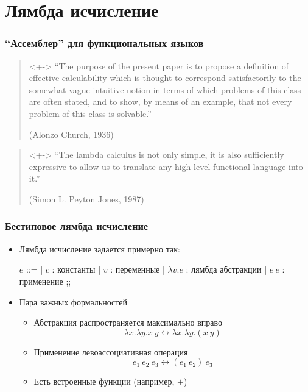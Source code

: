\documentclass[aspectratio=169]{beamer}
\begin{document}
\section{Лямбда исчисление}
\begin{frame}
    \frametitle{\enquote{Ассемблер} для функциональных языков}

    \begin{quotation}<+->
        \enquote{The purpose of the present paper is to propose a definition of effective calculability which is thought to correspond satisfactorily to the somewhat vague intuitive notion in terms of which problems of this class are often stated, and to show, by means of an example, that not every problem of this class is solvable.}

        \raggedleft
        (Alonzo Church, 1936)
    \end{quotation}

    \begin{quotation}<+->
        \enquote{The lambda calculus is not only simple, it is also sufficiently expressive to allow us to translate any high-level functional language into it.}

        \raggedleft
        (Simon L. Peyton Jones, 1987)
    \end{quotation}

\end{frame}

\begin{frame}
    \frametitle{Бестиповое лямбда исчисление}

    \begin{itemize}
        \item Лямбда исчисление задается примерно так:
              \begin{center}
                  \begin{bnf}
                      $e$ ::=
                      | $c$ : константы
                      | $v$ : переменные
                      | $\lambda v.e$ : лямбда абстракции
                      | $e\ e$ : применение
                      ;;
                  \end{bnf}
              \end{center}
        \item Пара важных формальностей
              \begin{itemize}
                  \item Абстракция распространяется максимально вправо
                        \[\lambda x. \lambda y. x\ y \leftrightarrow \lambda x. \lambda y. (x\ y)\]
                  \item Применение левоассоциативная операция
                        \[e_1\ e_2\ e_3 \leftrightarrow (e_1\ e_2)\ e_3\]
                  \item Есть встроенные функции (например, $+$)
              \end{itemize}
    \end{itemize}
\end{frame}
\end{document}
